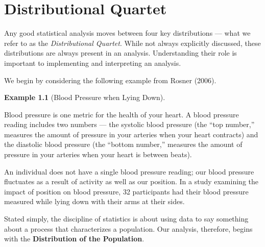 \documentclass[
  letterpaper,
  DIV=11,
  numbers=noendperiod]{scrreprt}
\theoremstyle{definition}
\theoremstyle{definition}
\newtheorem{example}{Example}[chapter]
\theoremstyle{remark}
\begin{document}
\hypertarget{sec-distributional-quartet}{%
\chapter{Distributional Quartet}\label{sec-distributional-quartet}}

\providecommand{\norm}[1]{\left\lVert#1\right\rVert}
\providecommand{\abs}[1]{\left\lvert#1\right\rvert}
\providecommand{\dist}[1]{\stackrel{\text{#1}}{\sim}}
\providecommand{\ind}[1]{\mathbb{I}\left(#1\right)}
\providecommand{\bm}[1]{\mathbf{#1}}
\providecommand{\bs}[1]{\boldsymbol{#1}}
\providecommand{\Ell}{\mathcal{L}}
\providecommand{\indep}{\perp\negthickspace\negmedspace\perp}

Any good statistical analysis moves between four key distributions ---
what we refer to as the \emph{Distributional Quartet}. While not always
explicitly discussed, these distributions are always present in an
analysis. Understanding their role is important to implementing and
interpreting an analysis.

We begin by considering the following example from Rosner (2006).

\begin{example}[Blood Pressure when Lying
Down]\protect\hypertarget{exm-distributional-quartet-bp}{}\label{exm-distributional-quartet-bp}

Blood pressure is one metric for the health of your heart. A blood
pressure reading includes two numbers --- the systolic blood pressure
(the ``top number,'' measures the amount of pressure in your arteries
when your heart contracts) and the diastolic blood pressure (the
``bottom number,'' measures the amount of pressure in your arteries when
your heart is between beats).

An individual does not have a single blood pressure reading; our blood
pressure fluctuates as a result of activity as well as our position. In
a study examining the impact of position on blood pressure, 32
participants had their blood pressure measured while lying down with
their arms at their sides.

\end{example}

Stated simply, the discipline of statistics is about using data to say
something about a process that characterizes a population. Our analysis,
therefore, begins with the \textbf{Distribution of the Population}.
\end{document}
